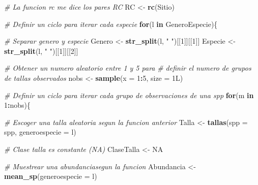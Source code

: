 \documentclass[]{krantz}
\newenvironment{Shaded}{\begin{snugshade}}{\end{snugshade}}
\newcommand{\CommentTok}[1]{\textcolor[rgb]{0.56,0.35,0.01}{\textit{#1}}}
\newcommand{\ControlFlowTok}[1]{\textcolor[rgb]{0.13,0.29,0.53}{\textbf{#1}}}
\newcommand{\DataTypeTok}[1]{\textcolor[rgb]{0.13,0.29,0.53}{#1}}
\newcommand{\DecValTok}[1]{\textcolor[rgb]{0.00,0.00,0.81}{#1}}
\newcommand{\KeywordTok}[1]{\textcolor[rgb]{0.13,0.29,0.53}{\textbf{#1}}}
\newcommand{\NormalTok}[1]{#1}
\newcommand{\OperatorTok}[1]{\textcolor[rgb]{0.81,0.36,0.00}{\textbf{#1}}}
\newcommand{\OtherTok}[1]{\textcolor[rgb]{0.56,0.35,0.01}{#1}}
\newcommand{\StringTok}[1]{\textcolor[rgb]{0.31,0.60,0.02}{#1}}
\begin{document}
\begin{Shaded}
\begin{Highlighting}[]
{      \CommentTok{# La funcion rc me dice los pares RC}
\NormalTok{      RC <-}\StringTok{ }\KeywordTok{rc}\NormalTok{(Sitio)}
      
      \CommentTok{# Definir un ciclo para iterar cada especie}
      \ControlFlowTok{for}\NormalTok{(l }\ControlFlowTok{in}\NormalTok{ GeneroEspecie)\{}
        
        \CommentTok{# Separar genero y especie}
\NormalTok{        Genero <-}\StringTok{ }\KeywordTok{str_split}\NormalTok{(l, }\StringTok{" "}\NormalTok{)[[}\DecValTok{1}\NormalTok{]][[}\DecValTok{1}\NormalTok{]]}
\NormalTok{        Especie <-}\StringTok{ }\KeywordTok{str_split}\NormalTok{(l, }\StringTok{" "}\NormalTok{)[[}\DecValTok{1}\NormalTok{]][[}\DecValTok{2}\NormalTok{]]}
        
        \CommentTok{# Obtener un numero aleatorio entre 1 y 5 para}
        \CommentTok{# definir el numero de grupos de tallas observados}
\NormalTok{        nobs <-}\StringTok{ }\KeywordTok{sample}\NormalTok{(}\DataTypeTok{x =} \DecValTok{1}\OperatorTok{:}\DecValTok{5}\NormalTok{, }\DataTypeTok{size =}\NormalTok{ 1L)}
        
        \CommentTok{# Definir un ciclo para iterar cada grupo de observaciones de una spp}
        \ControlFlowTok{for}\NormalTok{(m }\ControlFlowTok{in} \DecValTok{1}\OperatorTok{:}\NormalTok{nobs)\{}
          
          \CommentTok{# Escoger una talla aleatoria segun la funcion anterior}
\NormalTok{          Talla <-}\StringTok{ }\KeywordTok{tallas}\NormalTok{(}\DataTypeTok{spp =}\NormalTok{ spp, }\DataTypeTok{generoespecie =}\NormalTok{ l)}
          
          \CommentTok{# Clase talla es constante (NA)}
\NormalTok{          ClaseTalla <-}\StringTok{ }\OtherTok{NA}
          
          \CommentTok{# Muestrear una abundanciasegun la funcion}
\NormalTok{          Abundancia <-}\StringTok{ }\KeywordTok{mean_sp}\NormalTok{(}\DataTypeTok{generoespecie =}\NormalTok{ l)}
          
}
\end{Highlighting}
\end{Shaded}
\end{document}
